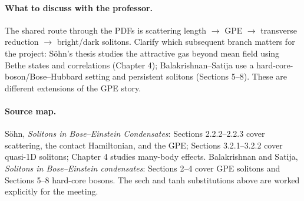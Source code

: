 \documentclass[11pt,a4paper]{article}
\begin{document}
\paragraph{What to discuss with the professor.}
The shared route through the PDFs is scattering length $\to$ GPE $\to$ transverse reduction $\to$ bright/dark solitons. Clarify which subsequent branch matters for the project: S\"ohn's thesis studies the attractive gas beyond mean field using Bethe states and correlations (Chapter 4); Balakrishnan--Satija use a hard-core-boson/Bose--Hubbard setting and persistent solitons (Sections 5--8). These are different extensions of the GPE story.

\paragraph{Source map.}
S\"ohn, \emph{Solitons in Bose--Einstein Condensates}: Sections 2.2.2--2.2.3 cover scattering, the contact Hamiltonian, and the GPE; Sections 3.2.1--3.2.2 cover quasi-1D solitons; Chapter 4 studies many-body effects. Balakrishnan and Satija, \emph{Solitons in Bose--Einstein condensates}: Sections 2--4 cover GPE solitons and Sections 5--8 hard-core bosons. The sech and tanh substitutions above are worked explicitly for the meeting.
\end{document}
